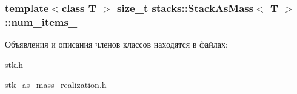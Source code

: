 \subsubsection[{num\+\_\+items\+\_\+}]{\setlength{\rightskip}{0pt plus 5cm}template$<$class T $>$ size\+\_\+t {\bf stacks\+::\+Stack\+As\+Mass}$<$ T $>$\+::num\+\_\+items\+\_\+\hspace{0.3cm}{\ttfamily [private]}}\label{classstacks_1_1_stack_as_mass_a3adff034672496130598a225d4a4bc0f}


Объявления и описания членов классов находятся в файлах\+:\begin{DoxyCompactItemize}
\item 
\hyperlink{stk_8h}{stk.\+h}\item 
\hyperlink{stk__as__mass__realization_8h}{stk\+\_\+as\+\_\+mass\+\_\+realization.\+h}\end{DoxyCompactItemize}
